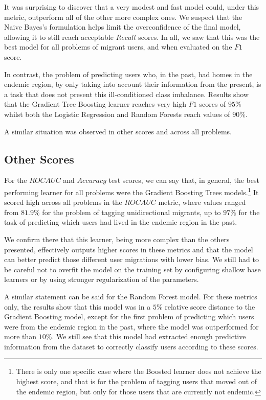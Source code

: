 It was surprising to discover that a very modest and fast model could, under this metric, outperform all of the other more complex ones.
We suspect that the Naive Bayes's formulation helps limit the overconfidence of the final model, allowing it to still reach acceptable $Recall$ scores.
In all, we saw that this was the best model for all problems of migrant users, and when evaluated on the $F1$ score.

In contrast, the problem of predicting users who, in the past, had homes in the endemic region, by only taking into account their information from the present, is a task that does not present this ill-conditioned class imbalance.
Results show that the Gradient Tree Boosting learner reaches very high $F1$ scores of $95\%$ whilst both the Logistic Regression and Random Forests reach values of $90\%$.

A similar situation was observed in other scores and across all problems.


\subsection{Other Scores}\label{subsec:master_table_other_scores}

For the $ROC AUC$ and $Accuracy$ test scores, we can say that, in general, the best performing learner for all problems were the Gradient Boosting Trees models.\footnote{There is only one specific case where the Boosted learner does not achieve the highest score, and that is for the problem of tagging users that moved out of the endemic region, but only for those users that are currently not endemic.}
It scored high across all problems in the $ROC AUC$ metric, where values ranged from $81.9\%$ for the problem of tagging unidirectional migrants, up to $97\%$ for the task of predicting which users had lived in the endemic region in the past.

We confirm there that this learner, being more complex than the others presented, effectively outputs higher scores in these metrics and
that the model can better predict those different user migrations with lower bias.
We still had to be careful not to overfit the model on the training set by configuring shallow base learners or by using stronger regularization of the parameters.

A similar statement can be said for the Random Forest model.
For these metrics only, the results show that this model was in a $5\%$ relative score distance to the Gradient Boosting model, except for the first problem of predicting which users were from the endemic region in the past, where the model was outperformed for more than $10\%$.
We still see that this model had extracted enough predictive information from the dataset to correctly classify users according to these scores.

